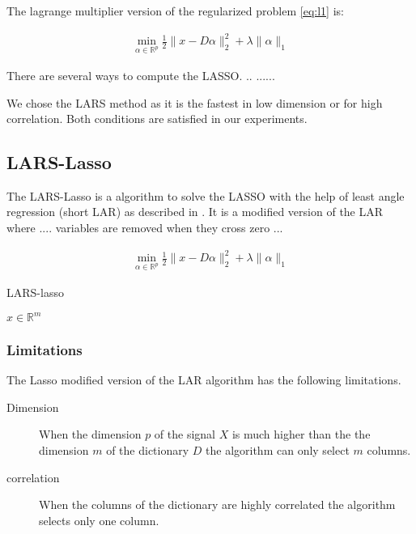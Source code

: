 The lagrange multiplier version of the regularized problem \ref{eq:l1} is:

\begin{align}
\min_{\alpha\in\mathbb{R}^{p}}  \frac{1}{2} \lVert x - D\alpha \rVert^{2}_{2} + \lambda \lVert \alpha \rVert_{1}
\end{align}

There are several ways to compute the LASSO. .. ...... 


We chose the LARS method as it is the fastest in low dimension or for high correlation. Both conditions are satisfied in our experiments.

\subsection {LARS-Lasso}
\label{sec:lars}
The LARS-Lasso is a algorithm to solve the LASSO with the help of least angle regression (short LAR)
as described in \cite{Efron2004}. It is a modified version of the LAR where .... variables are removed when they cross zero ...


\begin{align}
\min_{\alpha\in\mathbb{R}^{p}}  \frac{1}{2} \lVert x - D\alpha \rVert^{2}_{2} + \lambda \lVert \alpha \rVert_{1}
\end{align}

\begin{algorithm}
\caption{LARS-lasso}
\begin{algorithmic}[1]
\REQUIRE $x \in \mathbb{R}^m$
\end{algorithmic}
\end{algorithm}

\subsubsection*{Limitations}
The Lasso modified version of the LAR algorithm has the following limitations.
\begin{description}
 \item[Dimension] When the dimension $p$ of the signal $X$ is 
much higher than the the dimension $m$ of the dictionary $D$ the algorithm can only select $m$ columns.

\item[correlation] When the columns of the dictionary are highly correlated the algorithm
selects only one column.
\end{description}

